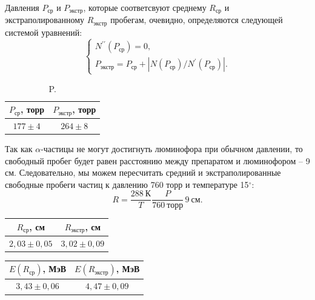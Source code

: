 \documentclass[a4paper,12pt]{article} %
\begin{document}
		Давления $P_\text{ср}$ и $P_\text{экстр}$, которые соответсвуют среднему $R_\text{ср}$ и экстраполированному $R_\text{экстр}$ пробегам, очевидно, определяются следующей системой уравнений:
		\begin{equation*}
			\begin{cases}
				N^{\prime \prime} (P_\text{ср}) = 0, \\
				P_\text{экстр} = P_\text{ср} + \left|N(P_\text{ср})/N^\prime(P_\text{ср})\right|.
			\end{cases}
		\end{equation*}
	
		\begin{table}[H]
			\caption{P.}
			\label{tab:P}
			\begin{tabular}{|c|c|}
				\hline
				$P_\text{ср}$, торр & $P_\text{экстр}$, торр \\ \hline
				$177 \pm 4 $   & $264 \pm 8$       \\ \hline
			\end{tabular}
		\end{table}
	
		\newpage
		Так как $\alpha$-частицы не могут достигнуть люминофора при обычном давлении, то свободный пробег будет равен расстоянию между препаратом и люминофором -- 9 см. Следовательно, мы можем пересчитать средний и экстраполированные свободные пробеги частиц к давлению 760 торр и температуре 15$^\circ$:
		\begin{equation*}
			R = \frac{288 \ \text{К}}{T}\frac{P}{760 \ \text{торр}}\, 9 \ \text{см}.
		\end{equation*}
		
		\begin{table}[h!]
			\begin{floatrow}
				{\begin{tabular}{|c|c|}
						\hline
						$R_\text{ср}$, см & $R_\text{экстр}$, см \\ \hline
						$2,03 \pm 0,05 $   & $3,02 \pm 0,09$       \\ \hline
				\end{tabular}}
				{\begin{tabular}{|c|c|}
						\hline
						$E(R_\text{ср})$, МэВ & $E(R_\text{экстр})$, МэВ \\ \hline
						$3,43 \pm 0,06 $     & $4,47 \pm 0,09 $        \\ \hline
				\end{tabular}}        
			\end{floatrow}
		\end{table}
	
\end{document}
